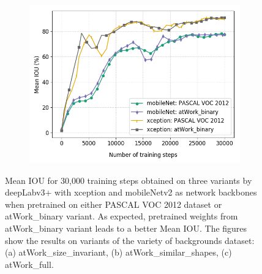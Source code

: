 \begin{figure}
\begin{subfigure}{.3\textwidth}
			\caption{}
		\end{subfigure}
		\begin{subfigure}{.3\textwidth}
			\centering
			\includegraphics[width=1\linewidth]{images/transfer_full}
			\caption{}
		\end{subfigure}
		\caption{Mean IOU for 30,000 training steps obtained on three variants by deepLabv3+ with xception and mobileNetv2 as network backbones when pretrained on either PASCAL VOC 2012 dataset or atWork\_binary variant. As expected, pretrained weights from atWork\_binary variant leads to a better Mean IOU. The figures show the results on variants of the variety of backgrounds dataset: (a) atWork\_size\_invariant, (b) atWork\_similar\_shapes, (c) atWork\_full.}
		\label{Fig:transfer}
	\end{figure}

